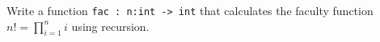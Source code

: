Write a function \lstinline{fac : n:int -> int} that calculates the faculty function $n! = \prod_{i=1}^ni$ using recursion.
